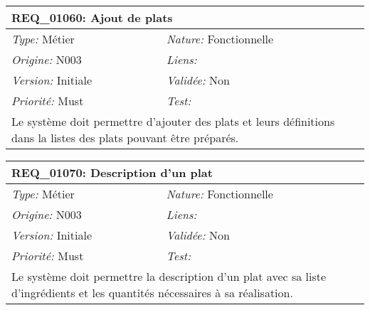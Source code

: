 \begin{table}[!ht]

\begin{tabular}{|p{60mm}p{100mm}|}

\hline

\multicolumn{2}{|l|}{\textbf{REQ\_01060:} Ajout de plats} \\ \hline

\emph{Type:} Métier & \emph{Nature:} Fonctionnelle \\

\emph{Origine:} N003 & \emph{Liens:}  \\

\emph{Version:} Initiale & \emph{Validée:} Non \\

\emph{Priorité:} Must & \emph{Test:} \\ \hline

\multicolumn{2}{|p{16cm}|}{Le système doit permettre d'ajouter des plats et leurs définitions dans la listes des plats pouvant être préparés.} \\ \hline

\end{tabular}

\end{table}



\begin{table}[!ht]

\begin{tabular}{|p{60mm}p{100mm}|}

\hline

\multicolumn{2}{|l|}{\textbf{REQ\_01070:} Description d'un plat} \\ \hline

\emph{Type:} Métier & \emph{Nature:} Fonctionnelle \\

\emph{Origine:} N003 & \emph{Liens:}  \\

\emph{Version:} Initiale & \emph{Validée:} Non \\

\emph{Priorité:} Must & \emph{Test:} \\ \hline

\multicolumn{2}{|p{16cm}|}{Le système doit permettre la description d'un plat avec sa liste d'ingrédients et les quantités nécessaires à sa réalisation.} \\ \hline

\end{tabular}

\end{table}



